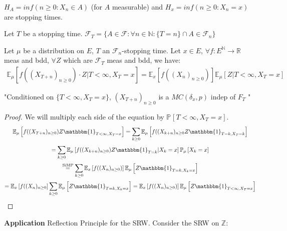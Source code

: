 \begin{ex}
	$H_{A}=inf(n \geq 0: X_n \in  A)$ (for $A$ measurable) and $H_x=inf(n\geq 0: X_n = x)$ are stopping times.
\end{ex}

\begin{defn}
	Let $T$ be a stopping time. $ \mathcal{F}_T=\{A \in \mathcal{F}: \forall n \in \mathbb{N}: \{T=n\}\cap A \in \mathcal{F}_n \}$
\end{defn}

\begin{theorem}
	Let $\mu $ be a distribution on $E$, $T$ an $ \mathcal{F}_n$-stopping time. Let $x \in E$,
	$\forall f:E^{\mathbb{N}} \to \mathbb{R}$ meas and bdd, $\forall Z$ which are $ \mathcal{F}_T$ meas and bdd, we have:
\begin{align}
	\mathbb{E}_{\mu } \left[ f((X_{T+n})_{n\geq 0}) \cdot Z | T<\infty, X_T=x \right] = \mathbb{E}_{x} \left[ f((X_n)_{n\geq 0}) \right]  \mathbb{E}_{\mu } \left[ Z | T<\infty, X_T=x \right] 
\end{align}

\end{theorem}
\noindent
"Conditioned on $\{T<\infty,X_T=x\}$, $(X_{T+n})_{n\geq 0}$ is a $MC(\delta_x,p)$ indep of $F_T$ "
\begin{proof}
We will multiply each side of the equation by $\mathbb{P}_{} \left[ T < \infty, X_T =x \right]$.
\begin{gather}
	\mathbb{E}_{\mu } \left[ f((X_{T+n})_{n\geq 0})Z \mathbbm{1}_{T<\infty, X_T=x}  \right] = \sum_{k\geq 0}^{} \mathbb{E}_{\mu } \left[ f((X_{k+n})_{n\geq 0} Z \mathbbm{1}_{T=k, X_T=k}  \right] \\
	= \sum_{k\geq 0}^{} \mathbb{E}_{\mu } \left[ f((X_{k+n})_{n\geq 0}) Z \mathbbm{1}_{T=k} | X_k = x \right] \mathbb{P}_{\mu } \left[ X_k = x  \right] \\ 
	\stackrel{\text{SiMP}}{=} \sum_{k\geq 0}^{} \mathbb{E}_{x} \left[ f((X_{n})_{n\geq 0}) \right] \mathbb{E}_{\mu } \left[ Z \mathbbm{1}_{T=k, X_k = x}  \right] \\
	= \mathbb{E}_{x} \left[ f((X_n)_{n\geq 0} \right] \sum_{k\geq 0}^{} \mathbb{E}_{\mu } \left[ Z \mathbbm{1}_{T=k, X_k=x}  \right]  
	= \mathbb{E}_{x} \left[ f((X_n)_{n\geq 0}) \right] \mathbb{E}_{\mu } \left[ Z \mathbbm{1}_{T<\infty, X_T=x}  \right] 
\end{gather}
\end{proof}


\noindent
\textbf{Application} Reflection Principle for the SRW.
Consider the SRW on $\mathbb{Z}$: 


